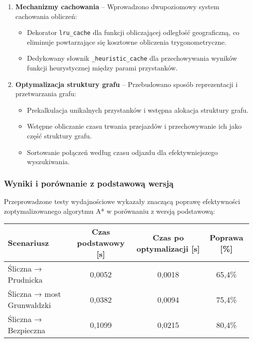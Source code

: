 \documentclass[12pt,a4paper]{article}
\begin{document}
\begin{enumerate}
    \item \textbf{Mechanizmy cachowania} -- Wprowadzono dwupoziomowy system cachowania obliczeń:
    \begin{itemize}
        \item Dekorator \texttt{lru\_cache} dla funkcji obliczającej odległość geograficzną, co eliminuje powtarzające się kosztowne obliczenia trygonometryczne.
        \item Dedykowany słownik \texttt{\_heuristic\_cache} dla przechowywania wyników funkcji heurystycznej między parami przystanków.
    \end{itemize}
    
    \item \textbf{Optymalizacja struktury grafu} -- Przebudowano sposób reprezentacji i przetwarzania grafu:
    \begin{itemize}
        \item Prekalkulacja unikalnych przystanków i wstępna alokacja struktury grafu.
        \item Wstępne obliczanie czasu trwania przejazdów i przechowywanie ich jako część struktury grafu.
        \item Sortowanie połączeń według czasu odjazdu dla efektywniejszego wyszukiwania.
    \end{itemize}

\end{enumerate}

\subsubsection{Wyniki i porównanie z podstawową wersją}
Przeprowadzone testy wydajnościowe wykazały znaczącą poprawę efektywności zoptymalizowanego algorytmu A* w porównaniu z wersją podstawową:

\begin{center}
\begin{tabular}{|l|c|c|c|}
\hline
\textbf{Scenariusz} & \textbf{Czas podstawowy [s]} & \textbf{Czas po optymalizacji [s]} & \textbf{Poprawa [\%]} \\
\hline
Śliczna → Prudnicka & 0,0052 & 0,0018 & 65,4\% \\
Śliczna → most Grunwaldzki & 0,0382 & 0,0094 & 75,4\% \\
Śliczna → Bezpieczna & 0,1099 & 0,0215 & 80,4\% \\
\hline
\end{tabular}
\end{center}
\end{document}
